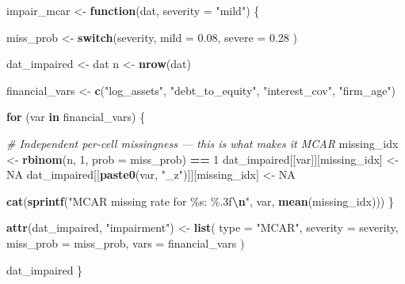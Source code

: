 \documentclass[
]{article}
\newenvironment{Shaded}{\begin{snugshade}}{\end{snugshade}}
\newcommand{\AttributeTok}[1]{\textcolor[rgb]{0.13,0.29,0.53}{#1}}
\newcommand{\CommentTok}[1]{\textcolor[rgb]{0.56,0.35,0.01}{\textit{#1}}}
\newcommand{\ConstantTok}[1]{\textcolor[rgb]{0.56,0.35,0.01}{#1}}
\newcommand{\ControlFlowTok}[1]{\textcolor[rgb]{0.13,0.29,0.53}{\textbf{#1}}}
\newcommand{\DecValTok}[1]{\textcolor[rgb]{0.00,0.00,0.81}{#1}}
\newcommand{\FloatTok}[1]{\textcolor[rgb]{0.00,0.00,0.81}{#1}}
\newcommand{\FunctionTok}[1]{\textcolor[rgb]{0.13,0.29,0.53}{\textbf{#1}}}
\newcommand{\NormalTok}[1]{#1}
\newcommand{\OtherTok}[1]{\textcolor[rgb]{0.56,0.35,0.01}{#1}}
\newcommand{\SpecialCharTok}[1]{\textcolor[rgb]{0.81,0.36,0.00}{\textbf{#1}}}
\newcommand{\StringTok}[1]{\textcolor[rgb]{0.31,0.60,0.02}{#1}}
\begin{document}
\begin{Shaded}
\begin{Highlighting}[]
\NormalTok{impair\_mcar }\OtherTok{\textless{}{-}} \ControlFlowTok{function}\NormalTok{(dat, }\AttributeTok{severity =} \StringTok{"mild"}\NormalTok{) \{}
  
  
\NormalTok{  miss\_prob }\OtherTok{\textless{}{-}} \ControlFlowTok{switch}\NormalTok{(severity,}
    \AttributeTok{mild   =} \FloatTok{0.08}\NormalTok{,}
    \AttributeTok{severe =} \FloatTok{0.28}
\NormalTok{  )}
  
\NormalTok{  dat\_impaired }\OtherTok{\textless{}{-}}\NormalTok{ dat}
\NormalTok{  n }\OtherTok{\textless{}{-}} \FunctionTok{nrow}\NormalTok{(dat)}
  
\NormalTok{  financial\_vars }\OtherTok{\textless{}{-}} \FunctionTok{c}\NormalTok{(}\StringTok{"log\_assets"}\NormalTok{, }\StringTok{"debt\_to\_equity"}\NormalTok{, }\StringTok{"interest\_cov"}\NormalTok{, }\StringTok{"firm\_age"}\NormalTok{)}
  
  \ControlFlowTok{for}\NormalTok{ (var }\ControlFlowTok{in}\NormalTok{ financial\_vars) \{}
    
    \CommentTok{\# Independent per{-}cell missingness — this is what makes it MCAR}
\NormalTok{    missing\_idx }\OtherTok{\textless{}{-}} \FunctionTok{rbinom}\NormalTok{(n, }\DecValTok{1}\NormalTok{, }\AttributeTok{prob =}\NormalTok{ miss\_prob) }\SpecialCharTok{==} \DecValTok{1}
\NormalTok{    dat\_impaired[[var]][missing\_idx] }\OtherTok{\textless{}{-}} \ConstantTok{NA}
\NormalTok{    dat\_impaired[[}\FunctionTok{paste0}\NormalTok{(var, }\StringTok{"\_z"}\NormalTok{)]][missing\_idx] }\OtherTok{\textless{}{-}} \ConstantTok{NA}
    
    \FunctionTok{cat}\NormalTok{(}\FunctionTok{sprintf}\NormalTok{(}\StringTok{"MCAR missing rate for \%s: \%.3f}\SpecialCharTok{\textbackslash{}n}\StringTok{"}\NormalTok{, var, }\FunctionTok{mean}\NormalTok{(missing\_idx)))}
\NormalTok{  \}}
  
  \FunctionTok{attr}\NormalTok{(dat\_impaired, }\StringTok{"impairment"}\NormalTok{) }\OtherTok{\textless{}{-}} \FunctionTok{list}\NormalTok{(}
    \AttributeTok{type      =} \StringTok{"MCAR"}\NormalTok{,}
    \AttributeTok{severity  =}\NormalTok{ severity,}
    \AttributeTok{miss\_prob =}\NormalTok{ miss\_prob,}
    \AttributeTok{vars      =}\NormalTok{ financial\_vars}
\NormalTok{  )}
  
\NormalTok{  dat\_impaired}
\NormalTok{\}}
\end{Highlighting}
\end{Shaded}
\end{document}

